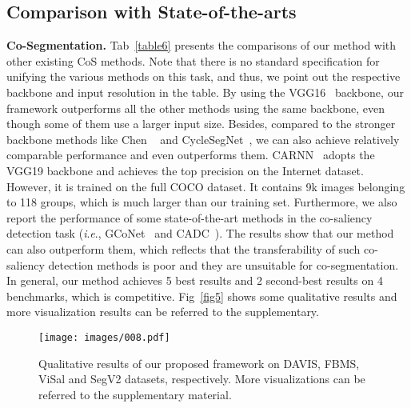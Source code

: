 \documentclass[journal]{IEEEtran}
\newcommand{\ie}{\textit{i}.\textit{e}., }
\begin{document}
\subsection{Comparison with State-of-the-arts}

\noindent \textbf{Co-Segmentation.} Tab~\ref{table6} presents the comparisons of our method with other existing CoS methods. Note that there is no standard specification for unifying the various methods on this task, and thus, we point out the respective backbone and input resolution in the table. By using the VGG16~\cite{simonyan2014very} backbone, our framework outperforms all the other methods using the same backbone, even though some of them use a larger input size. Besides, compared to the stronger backbone methods like Chen ~\cite{chen2020show} and CycleSegNet~\cite{zhang2021cyclesegnet}, we can also achieve relatively comparable performance and even outperforms them. CARNN~\cite{li2019group} adopts the VGG19 backbone and achieves the top 
precision on the Internet dataset. However, it is trained on the full COCO dataset. It contains 9k images belonging to 118 groups, which is much larger than our training set.
Furthermore, we also report the performance of some state-of-the-art methods in the co-saliency detection task (\ie GCoNet~\cite{fan2021group} and CADC~\cite{zhang2021summarize}). The results show that our method can also outperform them, which reflects that the transferability of such co-saliency detection methods is poor and they are unsuitable for co-segmentation.
In general, our method achieves 5 best results and 2 second-best results on 4 benchmarks, which is competitive. Fig~\ref{fig5} shows some qualitative results and more visualization results can be referred to the supplementary.


\begin{figure*}[t]
\begin{center}
	\centering
	\texttt{[image: images/008.pdf]}
\end{center}
\caption{Qualitative results of our proposed framework on DAVIS, FBMS, ViSal and SegV2 datasets, respectively. More visualizations can be referred to the supplementary material.}
\label{fig7}
\end{figure*}
\end{document}
